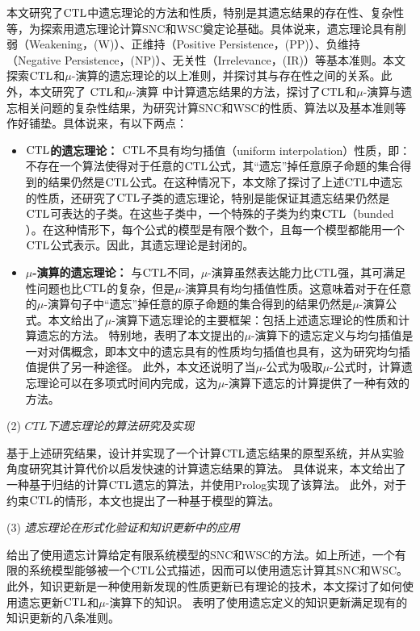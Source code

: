本文研究了$\textrm{CTL}$中遗忘理论的方法和性质，特别是其遗忘结果的存在性、复杂性等，为探索用遗忘理论计算SNC和WSC奠定论基础。具体说来，遗忘理论具有削弱（Weakening，(W)）、正维持（Positive Persistence，(PP)）、负维持（Negative Persistence，(NP)）、无关性（Irrelevance，(IR)）等基本准则\cite{Yan:AIJ:2009}。本文探索$\textrm{CTL}$和$\mu$-演算的遗忘理论的以上准则，并探讨其与存在性之间的关系。此外，本文研究了 $\textrm{CTL}$和$\mu$-演算 中计算遗忘结果的方法，探讨了$\textrm{CTL}$和$\mu$-演算与遗忘相关问题的复杂性结果，为研究计算SNC和WSC的性质、算法以及基本准则等作好铺垫。具体说来，有以下两点：
\begin{itemize}
	\item \textbf{$\textrm{CTL}$的遗忘理论：}
	$\textrm{CTL}$不具有均匀插值（uniform interpolation）性质\cite{Maksimova:JANCL:1991}，即：不存在一个算法使得对于任意的$\textrm{CTL}$公式，其“遗忘”掉任意原子命题的集合得到的结果仍然是$\textrm{CTL}$公式。在这种情况下，本文除了探讨了上述$\textrm{CTL}$中遗忘的性质，还研究了$\textrm{CTL}$子类的遗忘理论，特别是能保证其遗忘结果仍然是$\textrm{CTL}$可表达的子类。在这些子类中，一个特殊的子类为约束$\textrm{CTL}$（bunded \CTL）。在这种情形下，每个公式的模型是有限个数个，且每一个模型都能用一个$\textrm{CTL}$公式表示。因此，其遗忘理论是封闭的。
	
	\item \textbf{$\mu$-演算的遗忘理论：}
	与$\textrm{CTL}$不同，$\mu$-演算虽然表达能力比$\textrm{CTL}$强，其可满足性问题也比$\textrm{CTL}$的复杂，但是$\mu$-演算具有均匀插值性质\cite{DBLP:DAgostino:JAL:2006}。这意味着对于在任意的$\mu$-演算句子中“遗忘”掉任意的原子命题的集合得到的结果仍然是$\mu$-演算公式。本文给出了$\mu$-演算下遗忘理论的主要框架：包括上述遗忘理论的性质和计算遗忘的方法。
	特别地，表明了本文提出的$\mu$-演算下的遗忘定义与均匀插值是一对对偶概念，即本文中的遗忘具有的性质均匀插值也具有，这为研究均匀插值提供了另一种途径。
	此外，本文还说明了当$\mu$-公式为吸取$\mu$-公式时，计算遗忘理论可以在多项式时间内完成，这为$\mu$-演算下遗忘的计算提供了一种有效的方法。
\end{itemize}


(2) {\em $CTL$下遗忘理论的算法研究及实现}

基于上述研究结果，设计并实现了一个计算$\textrm{CTL}$遗忘结果的原型系统，并从实验角度研究其计算代价以启发快速的计算遗忘结果的算法。
具体说来，本文给出了一种基于归结的计算$\textrm{CTL}$遗忘的算法，并使用Prolog实现了该算法。
此外，对于约束$\textrm{CTL}$的情形，本文也提出了一种基于模型的算法。

(3) {\em 遗忘理论在形式化验证和知识更新中的应用}

给出了使用遗忘计算给定有限系统模型的SNC和WSC的方法。如上所述，一个有限的系统模型能够被一个$\textrm{CTL}$公式描述，因而可以使用遗忘计算其SNC和WSC。
此外，知识更新是一种使用新发现的性质更新已有理论的技术，本文探讨了如何使用遗忘更新$\textrm{CTL}$和$\mu$-演算下的知识。
表明了使用遗忘定义的知识更新满足现有的知识更新的八条准则。

